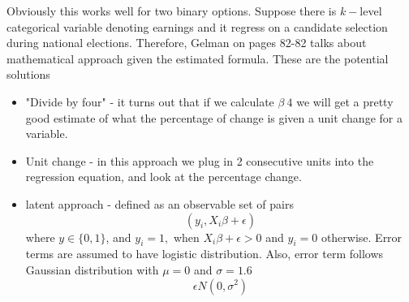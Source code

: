 \documentclass{article}
\begin{document}

Obviously this works well for two binary options. Suppose there is $k-$level categorical variable denoting earnings and it regress on a candidate selection during national elections. Therefore, Gelman on pages 82-82 talks about mathematical approach given the estimated formula. These are the potential solutions
\begin{itemize}
\item "Divide by four" - it turns out that if we calculate $\beta \ 4 $ we will get a pretty good estimate of what the percentage of change is given a unit change for a variable.
\item Unit change - in this approach we plug in 2 consecutive units into the regression equation, and look at the percentage change.
\item latent approach - defined as an observable set of pairs
\begin{equation}
(y_i, X_i\beta + \epsilon)
\end{equation}
where $y \in \{0,1\}$, and $y_i = 1,$ when $X_i\beta + \epsilon >0$ and $y_i = 0$ otherwise. Error terms are assumed to have logistic distribution. Also, error term follows Gaussian distribution with $\mu = 0$ and $\sigma = 1.6$
\begin{equation}
 \epsilon  N(0, \sigma^2)
\end{equation}
\end{itemize}
\end{document}
